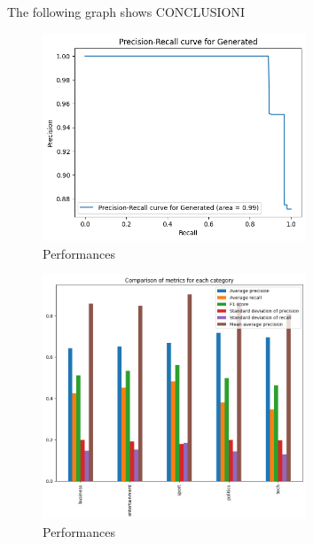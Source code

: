 The following graph shows CONCLUSIONI

\begin{figure}[H]
    \centering
    \includegraphics[width=0.7\textwidth]{images/whole_collection_performance.png}
    \caption{Performances}
    \label{fig:Performances}
\end{figure}

\begin{figure}[H]
    \centering
    \includegraphics[width=0.7\textwidth]{images/class_comparison.png}
    \caption{Performances}
    \label{fig:Performances}
\end{figure}

